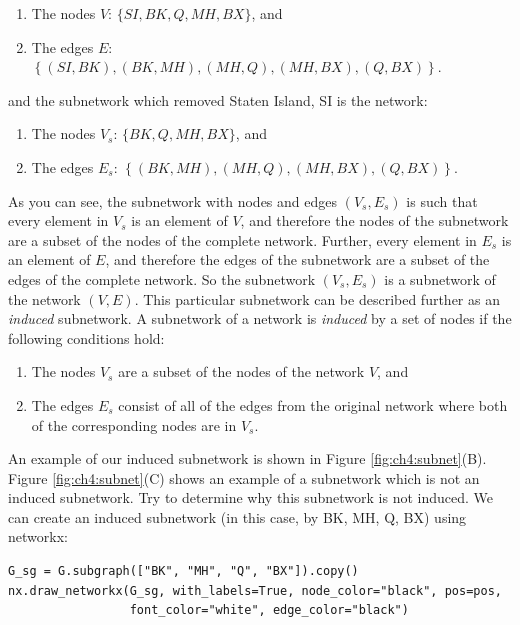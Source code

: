 \begin{enumerate}
    \item The nodes $V$: $\{SI, BK, Q, MH, BX\}$, and
    \item The edges $E$: $\left\{(SI, BK), (BK, MH), (MH, Q), (MH, BX), (Q, BX)\right\}$.
\end{enumerate}

and the subnetwork which removed Staten Island, SI is the network:

\begin{enumerate}
    \item The nodes $V_s$: $\{BK, Q, MH, BX\}$, and
    \item The edges $E_s$: $\left\{(BK, MH), (MH, Q), (MH, BX), (Q, BX)\right\}$.
\end{enumerate}

As you can see, the subnetwork with nodes and edges $(V_s, E_s)$ is such that every element in $V_s$ is an element of $V$, and therefore the nodes of the subnetwork are a subset of the nodes of the complete network. Further, every element in $E_s$ is an element of $E$, and therefore the edges of the subnetwork are a subset of the edges of the complete network. So the subnetwork $(V_s, E_s)$ is a subnetwork of the network $(V, E)$. This particular subnetwork can be described further as an \textit{induced} subnetwork. A subnetwork of a network is \textit{induced} by a set of nodes if the following conditions hold:

\begin{enumerate}
    \item The nodes $V_s$ are a subset of the nodes of the network $V$, and
    \item The edges $E_s$ consist of {all} of the edges from the original network where both of the corresponding nodes are in $V_s$.
\end{enumerate} 

An example of our induced subnetwork is shown in Figure \ref{fig:ch4:subnet}(B). Figure \ref{fig:ch4:subnet}(C) shows an example of a subnetwork which is {not} an induced subnetwork. Try to determine why this subnetwork is not induced. We can create an induced subnetwork (in this case, by BK, MH, Q, BX) using networkx:

\begin{lstlisting}[style=python]
G_sg = G.subgraph(["BK", "MH", "Q", "BX"]).copy()
nx.draw_networkx(G_sg, with_labels=True, node_color="black", pos=pos,
                 font_color="white", edge_color="black")
\end{lstlisting}

